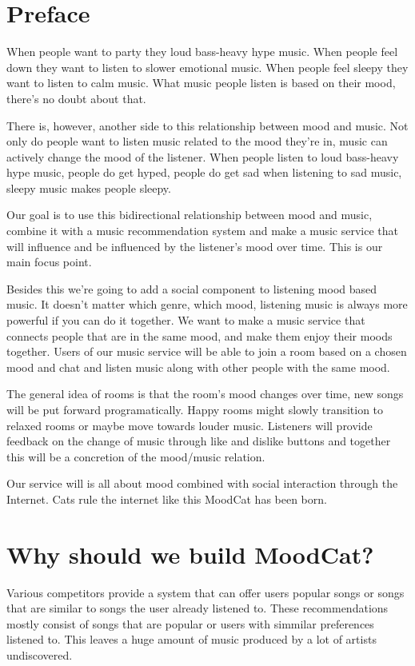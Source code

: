 \chapter*{Preface}

When people want to party they loud bass-heavy hype music.
When people feel down they want to listen to slower emotional music.
When people feel sleepy they want to listen to calm music.
What music people listen is based on their mood, there's no doubt about that.

There is, however, another side to this relationship between mood and music.
Not only do people want to listen music related to the mood they're in,
music can actively change the mood of the listener.
When people listen to loud bass-heavy hype music, people do get hyped,
people do get sad when listening to sad music,
sleepy music makes people sleepy.

Our goal is to use this bidirectional relationship between mood and music,
combine it with a music recommendation system and make a music service
that will influence and be influenced by the listener's mood over time.
This is our main focus point.

Besides this we're going to add a social component to listening mood based music.
It doesn't matter which genre, which mood, listening music is always more powerful if you can do it together.
We want to make a music service that connects people that are in the same mood, and make them enjoy their moods together.
Users of our music service will be able to join a room based on a chosen mood and chat and listen music along with other people with the same mood.

The general idea of rooms is that the room's mood changes over time, new songs will be put forward programatically. Happy rooms might slowly 
transition to relaxed rooms or maybe move towards louder music. Listeners will provide feedback on the change of music through like and dislike
buttons and together this will be a concretion of the mood/music relation.

Our service will is all about mood combined with social interaction through the Internet. Cats rule the internet like this MoodCat has been born.

\chapter{Why should we build MoodCat?}
Various competitors provide a system that can offer users popular songs or songs that are similar to songs the user already listened to.
These recommendations mostly consist of songs that are popular or users with simmilar preferences listened to.
This leaves a huge amount of music produced by a lot of artists undiscovered.

